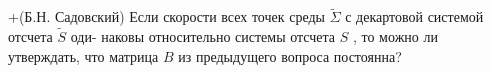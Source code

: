 +(Б.Н. Садовский)
Если скорости всех точек среды $\tilde\Sigma$ с декартовой системой отсчета $\tilde S$ оди-
наковы относительно системы отсчета $S$ , то можно ли утверждать, что
матрица $B$ из предыдущего вопроса постоянна?

